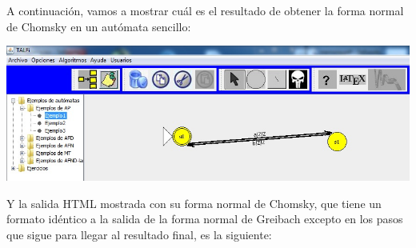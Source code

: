 \documentclass[12pt,a4paper,spanish]{book}
\begin{document}
A continuaci\'on, vamos a mostrar cu\'al es el resultado de obtener la forma normal de Chomsky en un aut\'omata sencillo:\\
\begin{center}
\includegraphics[width=\textwidth]{chom1.jpg}
\end{center}

Y la salida HTML mostrada con su forma normal de Chomsky, que tiene un formato id\'entico a la salida de la forma normal de Greibach excepto en los pasos que sigue para llegar al resultado final, es la siguiente:\\
\end{document}
